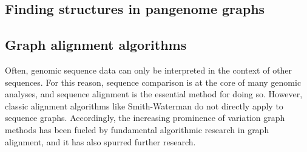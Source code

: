 


\subsection{Finding structures in pangenome graphs}


\subsection{Graph alignment algorithms}

Often, genomic sequence data can only be interpreted in the context of other sequences. 
For this reason, sequence comparison is at the core of many genomic analyses, and sequence alignment is the essential method for doing so. 
However, classic alignment algorithms like Smith-Waterman\cite{Smith_1981} do not directly apply to sequence graphs. 
Accordingly, the increasing prominence of variation graph methods has been fueled by fundamental algorithmic research in graph alignment, and it has also spurred further research.

